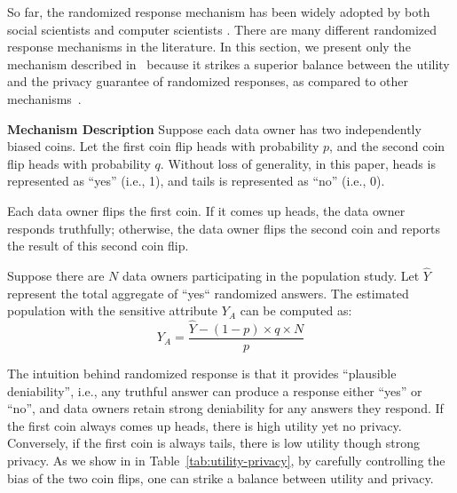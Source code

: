 \documentclass[conference]{IEEEtran}
\begin{document}
So far, the randomized response mechanism has been widely adopted by both social scientists and computer scientists \cite{warner1965randomized,DBLP:conf/ccs/ErlingssonPK14}. There are many different randomized response mechanisms in the literature.  In this section, we present only the mechanism described in~\cite{fox1986randomized} because it strikes a superior balance between the utility and the privacy guarantee of randomized responses, as compared to other mechanisms~\cite{warner1965randomized,kuk1990asking,greenberg1969unrelated,greenberg1971application}.


\textbf{Mechanism Description} Suppose each data owner has two independently biased coins. Let the first coin flip heads with probability $p$, and the second coin flip heads with probability $q$.  Without loss of generality, in this paper, heads is represented as ``yes'' (i.e., 1), and tails is represented as ``no'' (i.e., 0).


Each data owner flips the first coin. If it comes up heads, the data owner responds truthfully; otherwise, the data owner flips the second coin and reports the result of this second coin flip.

Suppose there are $N$ data owners participating in the population study. Let $\hat{Y}$ represent the total aggregate of ``yes`` randomized answers. The estimated population with the sensitive attribute $Y_A$ can be computed as:
\begin{equation}
\label{eqn:yo}
Y_A = \frac{\hat{Y} - (1 - p) \times q \times N}{p}
\end{equation}


The intuition behind randomized response is that it provides ``plausible deniability'', i.e., any truthful answer can produce a response either ``yes'' or ``no'', and data owners retain strong deniability for any answers they respond. If the first coin always comes up heads, there is high utility yet no privacy. Conversely, if the first coin is always tails, there is low utility though strong privacy. As we show in in Table~\ref{tab:utility-privacy}, by carefully controlling the bias of the two coin flips, one can strike a balance between utility and privacy.
\end{document}
